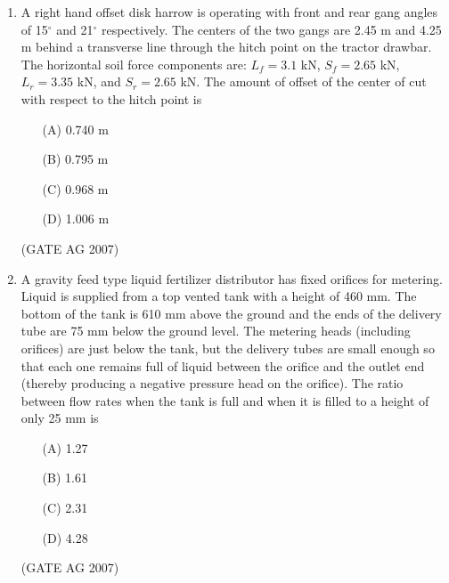 \documentclass[journal,12pt,onecolumn]{IEEEtran}
\theoremstyle{remark}
\begin{document}
\begin{enumerate}[label=Q\arabic*:]
\begin{multicols}{4}
\begin{enumerate}
    \item [(A)] 5.02 mm
    \item [(B)] 11.98 mm
    \item [(C)] 47.94 mm
    \item [(D)] 301.20 mm
\end{enumerate}
\end{multicols}
\hfill(GATE AG 2007)



\item A right hand offset disk harrow is operating with front and rear gang angles of 15$^\circ$ and 21$^\circ$ respectively. The centers of the two gangs are 2.45 m and 4.25 m behind a transverse line through the hitch point on the tractor drawbar. The horizontal soil force components are: $L_f = 3.1$ kN, $S_f = 2.65$ kN, $L_r = 3.35$ kN, and $S_r = 2.65$ kN. The amount of offset of the center of cut with respect to the hitch point is

\begin{multicols}{4}
\begin{enumerate}
    \item [(A)] 0.740 m
    \item [(B)] 0.795 m
    \item [(C)] 0.968 m
    \item [(D)] 1.006 m
\end{enumerate}
\end{multicols}
\hfill(GATE AG 2007)

\item A gravity feed type liquid fertilizer distributor has fixed orifices for metering. Liquid is supplied from a top vented tank with a height of 460 mm. The bottom of the tank is 610 mm above the ground and the ends of the delivery tube are 75 mm below the ground level. The metering heads (including orifices) are just below the tank, but the delivery tubes are small enough so that each one remains full of liquid between the orifice and the outlet end (thereby producing a negative pressure head on the orifice). The ratio between flow rates when the tank is full and when it is filled to a height of only 25 mm is  

\begin{multicols}{4}
\begin{enumerate}

    \item[(A)] 1.27
    \item[(B)] 1.61
    \item[(C)] 2.31
    \item[(D)] 4.28
\end{enumerate}
\end{multicols}
\hfill(GATE AG 2007)


\end{enumerate}
\end{document}
